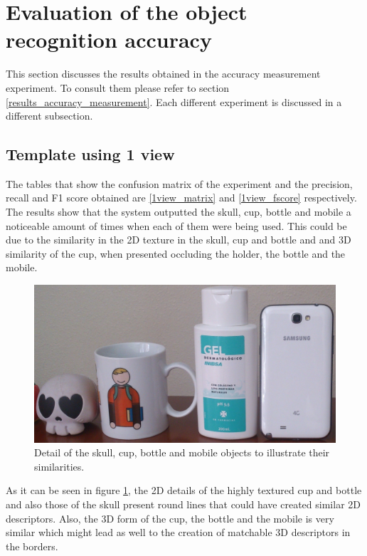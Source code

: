 \section{Evaluation of the object recognition accuracy}
\label{discussion_accuracy}
	This section discusses the results obtained in the accuracy measurement experiment. 
	To consult them please refer to section \ref{results_accuracy_measurement}.
	Each different experiment is discussed in a different subsection.


	\subsection{Template using 1 view}
	The tables that show the confusion matrix of the experiment and the precision, recall and F1 score obtained are \ref{1view_matrix} and \ref{1view_fscore} respectively. 
	The results show that the system outputted the skull, cup, bottle and mobile a noticeable amount of times when each of them were being used. 
	This could be due to the similarity in the 2D texture in the skull, cup and bottle and and 3D similarity of the cup, when presented occluding the holder, the bottle and the mobile. 

	\begin{figure}[h]
		\begin{center}
	    \includegraphics[width=\linewidth]{img/discussion/comparison1.jpg}
		\caption[Comparison: Skull, cup, bottle and mobile]{Detail of the skull, cup, bottle and mobile objects to illustrate their similarities. }
		\label{comparison1}
		\end{center}
	\end{figure}

	As it can be seen in figure \ref{comparison1}, the 2D details of the highly textured cup and bottle and also those of the skull present round lines that could have created similar 2D descriptors. 
	Also, the 3D form of the cup, the bottle and the mobile is very similar which might lead as well to the creation of matchable 3D descriptors in the borders. 
	\\

